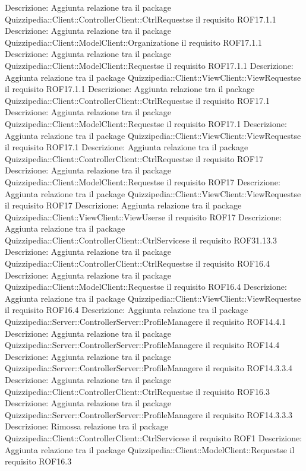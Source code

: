 Descrizione: Aggiunta relazione tra il package Quizzipedia::Client::ControllerClient::CtrlRequestse il requisito ROF17.1.1 
Descrizione: Aggiunta relazione tra il package Quizzipedia::Client::ModelClient::Organizatione il requisito ROF17.1.1 
Descrizione: Aggiunta relazione tra il package Quizzipedia::Client::ModelClient::Requestse il requisito ROF17.1.1 
Descrizione: Aggiunta relazione tra il package Quizzipedia::Client::ViewClient::ViewRequestse il requisito ROF17.1.1 
Descrizione: Aggiunta relazione tra il package Quizzipedia::Client::ControllerClient::CtrlRequestse il requisito ROF17.1 
Descrizione: Aggiunta relazione tra il package Quizzipedia::Client::ModelClient::Requestse il requisito ROF17.1 
Descrizione: Aggiunta relazione tra il package Quizzipedia::Client::ViewClient::ViewRequestse il requisito ROF17.1 
Descrizione: Aggiunta relazione tra il package Quizzipedia::Client::ControllerClient::CtrlRequestse il requisito ROF17 
Descrizione: Aggiunta relazione tra il package Quizzipedia::Client::ModelClient::Requestse il requisito ROF17 
Descrizione: Aggiunta relazione tra il package Quizzipedia::Client::ViewClient::ViewRequestse il requisito ROF17 
Descrizione: Aggiunta relazione tra il package Quizzipedia::Client::ViewClient::ViewUserse il requisito ROF17 
Descrizione: Aggiunta relazione tra il package Quizzipedia::Client::ControllerClient::CtrlServicese il requisito ROF31.13.3 
Descrizione: Aggiunta relazione tra il package Quizzipedia::Client::ControllerClient::CtrlRequestse il requisito ROF16.4 
Descrizione: Aggiunta relazione tra il package Quizzipedia::Client::ModelClient::Requestse il requisito ROF16.4 
Descrizione: Aggiunta relazione tra il package Quizzipedia::Client::ViewClient::ViewRequestse il requisito ROF16.4 
Descrizione: Aggiunta relazione tra il package Quizzipedia::Server::ControllerServer::ProfileManagere il requisito ROF14.4.1 
Descrizione: Aggiunta relazione tra il package Quizzipedia::Server::ControllerServer::ProfileManagere il requisito ROF14.4 
Descrizione: Aggiunta relazione tra il package Quizzipedia::Server::ControllerServer::ProfileManagere il requisito ROF14.3.3.4 
Descrizione: Aggiunta relazione tra il package Quizzipedia::Client::ControllerClient::CtrlRequestse il requisito ROF16.3 
Descrizione: Aggiunta relazione tra il package Quizzipedia::Server::ControllerServer::ProfileManagere il requisito ROF14.3.3.3 
Descrizione: Rimossa relazione tra il package Quizzipedia::Client::ControllerClient::CtrlServicese il requisito ROF1 
Descrizione: Aggiunta relazione tra il package Quizzipedia::Client::ModelClient::Requestse il requisito ROF16.3 
